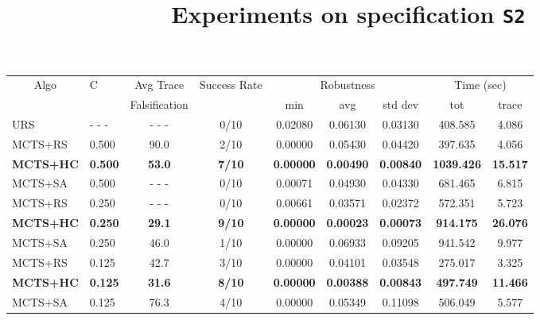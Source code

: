 \documentclass[11pt]{article}
\begin{document}
\begin{table}[ht]
\centering
\title{Experiments on specification \texttt{S2}}
\begin{tabular}{|l|l|c|c|c|c|c|c|c|}
\hline
\multicolumn{1}{|c|}{\multirow{2}{*}{Algo}} & \multirow{2}{*}{C} & Avg Trace               & \multirow{2}{*}{Success Rate} & \multicolumn{3}{c|}{Robustness} & \multicolumn{2}{c|}{Time (sec)} \\ \cline{5-9} 
\multicolumn{1}{|c|}{}                      &                    & Falsification           &                               & min      & avg      & std dev  & tot        & trace        \\ \hline
URS                                         & - - -              & - - -                   & 0/10                          & 0.02080  & 0.06130  & 0.03130  &  408.585   &  4.086       \\ \hline
MCTS+RS                                     & 0.500              &  90.0                   & 2/10                          & 0.00000  & 0.05430  & 0.04420  &  397.635   &  4.056       \\
\textbf{MCTS+HC}                                     & \textbf{0.500}              &  \textbf{53.0}                   & \textbf{7/10}                          & \textbf{0.00000}  & \textbf{0.00490}  & \textbf{0.00840}  & \textbf{1039.426}   & \textbf{15.517}       \\
MCTS+SA                                     & 0.500              & - - -                   & 0/10                          & 0.00071  & 0.04930  & 0.04330  &  681.465   &  6.815       \\ \hline

MCTS+RS                                     & 0.250              & - - -                   & 0/10                          & 0.00661  & 0.03571  & 0.02372  &  572.351   &  5.723       \\
\textbf{MCTS+HC}                                     & \textbf{0.250}              &  \textbf{29.1}                   & \textbf{9/10}                          & \textbf{0.00000}  & \textbf{0.00023}  & \textbf{0.00073}  &  \textbf{914.175}   & \textbf{26.076}       \\
MCTS+SA                                     & 0.250              &  46.0                   & 1/10                          & 0.00000  & 0.06933  & 0.09205  &  941.542   &  9.977       \\ \hline

MCTS+RS                                     & 0.125              &  42.7                   & 3/10                          & 0.00000  & 0.04101  & 0.03548  &  275.017   &  3.325       \\
\textbf{MCTS+HC}                                     & \textbf{0.125}              &  \textbf{31.6}                   & \textbf{8/10}                          & \textbf{0.00000}  & \textbf{0.00388}  & \textbf{0.00843}  &  \textbf{497.749}   & \textbf{11.466}       \\
MCTS+SA                                     & 0.125              &  76.3                   & 4/10                          & 0.00000  & 0.05349  & 0.11098  &  506.049   &  5.577       \\ \hline


\end{tabular}
\end{table}
\end{document}
